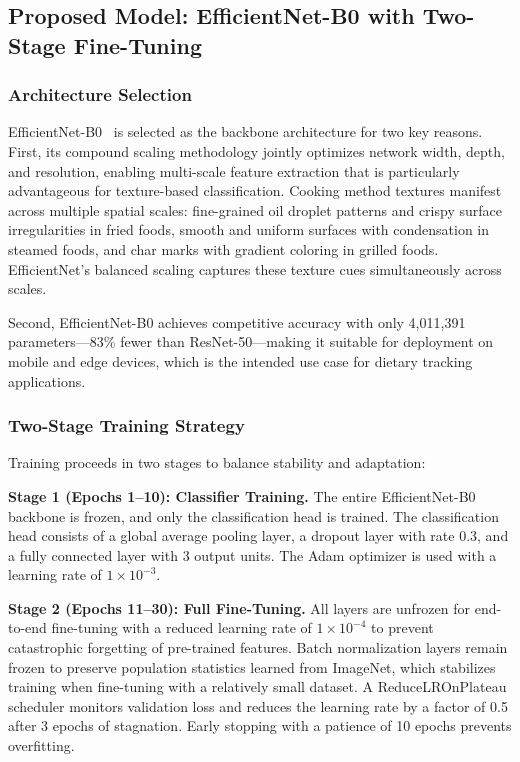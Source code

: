 \documentclass[journal]{IEEEtran}
\begin{document}
\subsection{Proposed Model: EfficientNet-B0 with Two-Stage Fine-Tuning}

\subsubsection{Architecture Selection}

EfficientNet-B0~\cite{tan2019efficientnet} is selected as the backbone architecture for two key reasons. First, its compound scaling methodology jointly optimizes network width, depth, and resolution, enabling multi-scale feature extraction that is particularly advantageous for texture-based classification. Cooking method textures manifest across multiple spatial scales: fine-grained oil droplet patterns and crispy surface irregularities in fried foods, smooth and uniform surfaces with condensation in steamed foods, and char marks with gradient coloring in grilled foods. EfficientNet's balanced scaling captures these texture cues simultaneously across scales.

Second, EfficientNet-B0 achieves competitive accuracy with only 4,011,391 parameters---83\% fewer than ResNet-50---making it suitable for deployment on mobile and edge devices, which is the intended use case for dietary tracking applications.

\subsubsection{Two-Stage Training Strategy}

Training proceeds in two stages to balance stability and adaptation:

\textbf{Stage 1 (Epochs 1--10): Classifier Training.} The entire EfficientNet-B0 backbone is frozen, and only the classification head is trained. The classification head consists of a global average pooling layer, a dropout layer with rate 0.3, and a fully connected layer with 3 output units. The Adam optimizer is used with a learning rate of $1 \times 10^{-3}$.

\textbf{Stage 2 (Epochs 11--30): Full Fine-Tuning.} All layers are unfrozen for end-to-end fine-tuning with a reduced learning rate of $1 \times 10^{-4}$ to prevent catastrophic forgetting of pre-trained features. Batch normalization layers remain frozen to preserve population statistics learned from ImageNet, which stabilizes training when fine-tuning with a relatively small dataset. A ReduceLROnPlateau scheduler monitors validation loss and reduces the learning rate by a factor of 0.5 after 3 epochs of stagnation. Early stopping with a patience of 10 epochs prevents overfitting.
\end{document}

